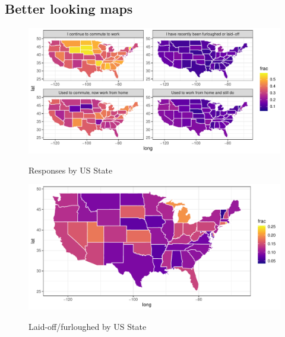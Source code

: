 \documentclass[12pt]{article}
\begin{document}
\subsection{Better looking maps} \label{sec:maps}

\begin{figure}
  \caption{Responses by US State} \label{fig:geo}
\centering
\begin{minipage}{1.0 \linewidth}
  \includegraphics[width = \linewidth]{plots/geo.pdf} \\
  \begin{footnotesize}
    \end{footnotesize}
\end{minipage}
\end{figure} 

\begin{figure}
  \caption{Laid-off/furloughed by US State} \label{fig:gender}
\centering
\begin{minipage}{1.0 \linewidth}
  \includegraphics[width = \linewidth]{plots/geo_laidoff.pdf} \\
  \begin{footnotesize}
    \end{footnotesize}
\end{minipage}
\end{figure} 
\end{document}
